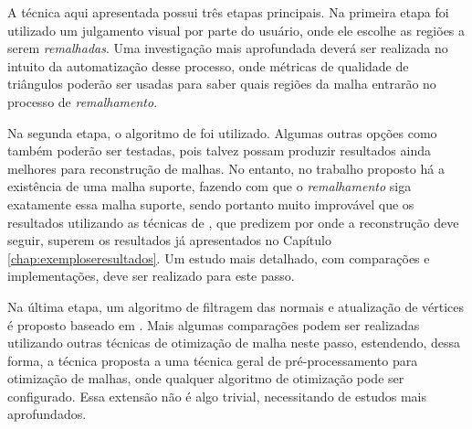 A técnica aqui apresentada possui três etapas principais. Na primeira etapa foi utilizado um julgamento visual por parte do usuário, onde ele escolhe as regiões a serem \textit{remalhadas}. Uma investigação mais aprofundada deverá ser realizada no intuito da automatização desse processo, onde métricas de qualidade de triângulos poderão ser usadas para saber quais regiões da malha entrarão no processo de \textit{remalhamento}. 

Na segunda etapa, o algoritmo de \cite{miranda2009surface} foi utilizado. Algumas outras opções como \cite{attene2013polygon, zhao2007robust} também poderão ser testadas, pois talvez possam produzir resultados ainda melhores para reconstrução de malhas. No entanto, no trabalho proposto há a existência de uma malha suporte, fazendo com que o \textit{remalhamento} siga exatamente essa malha suporte, sendo portanto muito improvável que os resultados utilizando as técnicas de \cite{attene2013polygon, zhao2007robust}, que predizem por onde a reconstrução deve seguir, superem os resultados já apresentados no Capítulo \ref{chap:exemploseresultados}. Um estudo mais detalhado, com comparações e implementações, deve ser realizado para este passo.

Na última etapa, um algoritmo de filtragem das normais e atualização de vértices é proposto baseado em \cite{zhang2015guided}. Mais algumas comparações podem ser realizadas utilizando outras técnicas de otimização de malha neste passo, estendendo, dessa forma, a técnica proposta a uma técnica geral de pré-processamento para otimização de malhas, onde qualquer algoritmo de otimização pode ser configurado. Essa extensão não é algo trivial, necessitando de estudos mais aprofundados.

